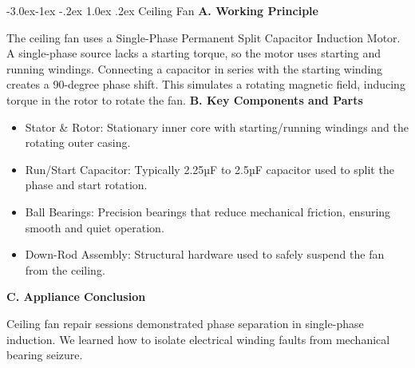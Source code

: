 \documentclass[11pt,a4paper]{report}
\makeatletter
\renewcommand{\subsection}{\@startsection{subsection}{2}{\z@}%
  {-3.0ex\@plus -1ex \@minus -.2ex}%
  {1.0ex \@plus .2ex}%
  {\normalfont\large\bfseries\color{secondaryColor}}}
\makeatother
\begin{document}
\subsection{Ceiling Fan}
\noindent\textbf{A. Working Principle}\par\medskip
The ceiling fan uses a Single-Phase Permanent Split Capacitor Induction Motor. A single-phase source lacks a starting torque, so the motor uses starting and running windings. Connecting a capacitor in series with the starting winding creates a 90-degree phase shift. This simulates a rotating magnetic field, inducing torque in the rotor to rotate the fan.
\noindent\textbf{B. Key Components and Parts}\par\medskip
\begin{itemize}
  \item Stator \& Rotor: Stationary inner core with starting/running windings and the rotating outer casing.
  \item Run/Start Capacitor: Typically 2.25µF to 2.5µF capacitor used to split the phase and start rotation.
  \item Ball Bearings: Precision bearings that reduce mechanical friction, ensuring smooth and quiet operation.
  \item Down-Rod Assembly: Structural hardware used to safely suspend the fan from the ceiling.
\end{itemize}
\noindent\textbf{C. Appliance Conclusion}\par\medskip
Ceiling fan repair sessions demonstrated phase separation in single-phase induction. We learned how to isolate electrical winding faults from mechanical bearing seizure.
\end{document}
